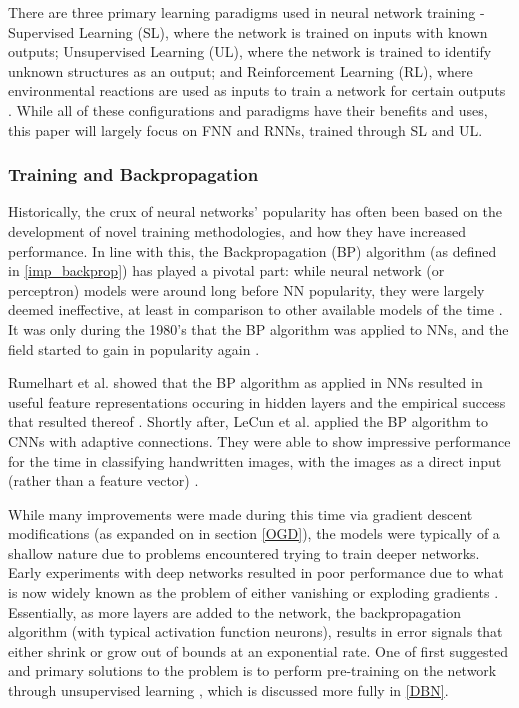\documentclass[a4paper,11pt,oneside]{article}
\theoremstyle{plain}
\theoremstyle{definition}
\begin{document}
There are three primary learning paradigms used in neural network training - Supervised Learning (SL), 
where the network is trained on inputs with known outputs; Unsupervised Learning (UL), where the network is 
trained to identify unknown structures as an output; and Reinforcement Learning (RL), where environmental
reactions are used as inputs to train a network for certain outputs \cite{Schmidhuber}. While all of these configurations and paradigms 
have their benefits and uses, this paper will largely focus on FNN and RNNs, trained through SL and UL.
\hfill \break 

\subsubsection{Training and Backpropagation}\label{lr_trainingbackprop}

Historically, the crux of neural networks’ popularity has often been based on the development of novel training 
methodologies, and how they have increased performance. In line with this, the Backpropagation (BP) algorithm (as defined in \ref{imp_backprop})
has played a pivotal part: while neural network (or perceptron) models were around long before NN popularity, 
they were largely deemed ineffective, at least in comparison to other available models of the time 
\cite{Minksy}. It was only during the 1980’s that the BP algorithm was applied to NNs, and 
the field started to gain in popularity again \cite{LeCun2, Werbos2}. 
\hfill \break 

Rumelhart et al. showed that the BP algorithm as applied in NNs resulted in useful feature representations 
occuring in hidden layers and the empirical success that resulted thereof \cite{Rumelhart}.  
Shortly after, LeCun et al. applied the BP algorithm to CNNs with adaptive connections. They were able to show 
impressive performance for the time in classifying handwritten images, with the images as a direct input (rather than a feature vector) \cite{LeCun3}.
\hfill \break 

While many improvements were made during this time via gradient descent modifications (as expanded on in section \ref{OGD}), the 
models were typically of a shallow nature due to problems encountered trying to train deeper networks. 
Early experiments with deep networks resulted in poor performance due to what is now widely known as the problem 
of either vanishing or exploding gradients \cite{Pascanu}. Essentially, as more layers are added to the network, the backpropagation 
algorithm (with typical activation function neurons), results in error signals that either shrink or grow out of bounds at an 
exponential rate. One of first suggested and primary solutions to the problem is to perform pre-training on the 
network through unsupervised learning  \cite{Schmidhuber}, which is discussed more fully in \ref{DBN}.
\hfill \break 
\end{document}
